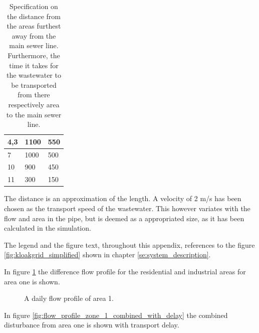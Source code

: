 \begin{table}[H]
\begin{tabular}{|l|l|l|}
4,3           & 1100                                                                                                             & 550                                                                                                          \\ \hline
7             & 1000                                                                                                             & 500                                                                                                          \\ \hline
10            & 900                                                                                                              & 450                                                                                                          \\ \hline
11            & 300                                                                                                              & 150                                                                                                          \\ \hline
\end{tabular}
\caption{Specification on the distance from the areas furthest away from the main sewer line. Furthermore, the time it takes for the wastewater to be transported from there respectively area to the main sewer line. }
\label{tab:table_areas}
\end{table} 

The distance is an approximation of the length. A velocity of 2 m/s has been chosen as the transport speed of the wastewater. This however variates with the flow and area in the pipe, but is deemed as a appropriated size, as it has been calculated in the simulation. 

The legend and the figure text, throughout this appendix, references to the figure \ref{fig:kloakgrid_simplified} shown in chapter \ref{se:system_description}. 

In figure \ref{fig:APP_flow_profile_thulevej} the difference flow profile for the residential and industrial areas for area one is shown.
\begin{figure}[H]
\centering

\caption{A daily flow profile of area 1.}
\label{fig:APP_flow_profile_thulevej}
\end{figure} 

In figure \ref{fig:flow_profile_zone_1_combined_with_delay} the combined disturbance from area one is shown with transport delay. 

